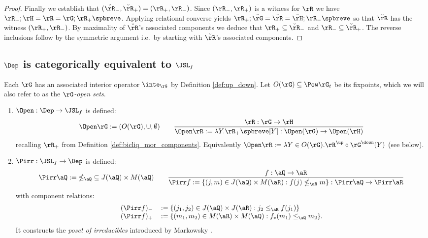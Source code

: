 \documentclass{article}
\begin{document}
\begin{proof}
\smallskip
Finally we establish that $(\breve{\rR}_-,\breve{\rR}_+) = (\rR_+,\rR_-)$. Since $(\rR_-,\rR_+)$ is a witness for $\rR$ we have $\rR_- ; \rH = \rR = \rG ; \rR_+\spbreve$.  Applying relational converse yields $\rR_+ ; \breve{\rG} = \breve{\rR} = \breve{\rH} ; \rR_-\spbreve$ so that $\breve{\rR}$ has the witness $(\rR_+,\rR_-)$. By maximality of $\breve{\rR}$'s associated components we deduce that $\rR_+ \subseteq \breve{\rR}_-$ and $\rR_- \subseteq \breve{\rR}_+$. The reverse inclusions follow by the symmetric argument i.e.\ by starting with $\breve{\rR}$'s associated components. 
\end{proof}


\subsection{$\Dep$ is categorically equivalent to $\JSL_f$}
\label{subsec:dep_equiv_jsl}

Each $\rG$ has an associated interior operator $\inte_\rG$ by Definition \ref{def:up_down}. Let $O(\rG) \subseteq \Pow \rG_t$ be its fixpoints, which we will also refer to as the \emph{$\rG$-open sets}.

\smallskip

\begin{definition}
\label{def:open_pirr}
\item
\begin{enumerate}
\item
$\Open : \Dep \to \JSL_f$ is defined:
\[
\Open \rG := (O(\rG),\cup,\emptyset)
\qquad
\dfrac
{\rR : \rG \to \rH}
{\Open \rR := \lambda Y. \rR_+\spbreve[Y] : \Open(\rG) \to \Open(\rH) }
\]
recalling $\rR_+$ from Definition \ref{def:bicliq_mor_components}. Equivalently $\Open\rR := \lambda Y \in O(\rG). \rR^\up \circ \rG^\down(Y)$ (see below).

\item
$\Pirr : \JSL_f \to \Dep$ is defined:
\[
\begin{tabular}{c}
$\Pirr \aQ := \; \nleq_{\aQ}\; \subseteq J(\aQ) \times M(\aQ)
\qquad
\dfrac{f : \aQ \to \aR}
{\Pirr f := \{ (j,m) \in J(\aQ) \times M(\aR) : f(j) \nleq_\aR m \} : \Pirr\aQ \to \Pirr\aR}$
\end{tabular}
\]
with component relations:
\[
\begin{tabular}{ll}
$(\Pirr f)_-$ & $:= \{ (j_1,j_2) \in J(\aQ) \times J(\aR) : j_2 \leq_\aR f(j_1) \}$
\\
$(\Pirr f)_+$ & $:= \{ (m_1,m_2) \in M(\aR) \times M(\aQ) : f_*(m_1) \leq_\aQ m_2 \}$.
\end{tabular}
\]
It constructs the \emph{poset of irreducibles} introduced by Markowsky \cite{MarkowskyLat1975}.
\endbox
\end{enumerate}
\end{definition}
\end{document}
